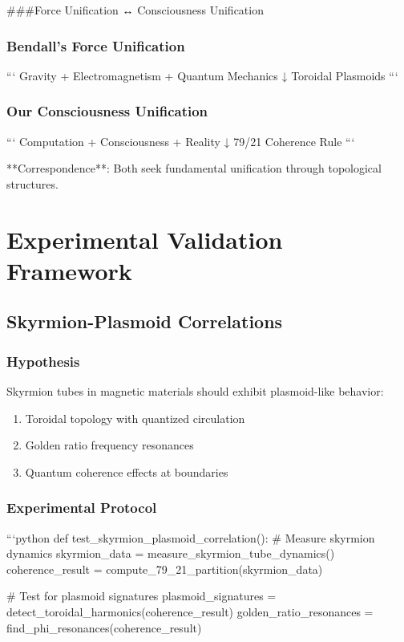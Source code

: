 \documentclass[12pt]{article}
\begin{document}
{###{Force Unification ↔ Consciousness Unification}

\subsubsection{Bendall's Force Unification}
```
Gravity + Electromagnetism + Quantum Mechanics
          ↓
     Toroidal Plasmoids
```

\subsubsection{Our Consciousness Unification}
```
Computation + Consciousness + Reality
          ↓
     79/21 Coherence Rule
```

**Correspondence**: Both seek fundamental unification through topological structures.

\section{Experimental Validation Framework}

\subsection{Skyrmion-Plasmoid Correlations}

\subsubsection{Hypothesis}
Skyrmion tubes in magnetic materials should exhibit plasmoid-like behavior:
\begin{enumerate}
    \item Toroidal topology with quantized circulation
    \item Golden ratio frequency resonances
    \item Quantum coherence effects at boundaries
\end{enumerate}

\subsubsection{Experimental Protocol}
```python
def test_skyrmion_plasmoid_correlation():
    # Measure skyrmion dynamics
    skyrmion_data = measure_skyrmion_tube_dynamics()
    coherence_result = compute_79_21_partition(skyrmion_data)

    # Test for plasmoid signatures
    plasmoid_signatures = detect_toroidal_harmonics(coherence_result)
    golden_ratio_resonances = find_phi_resonances(coherence_result)

}
\end{document}
